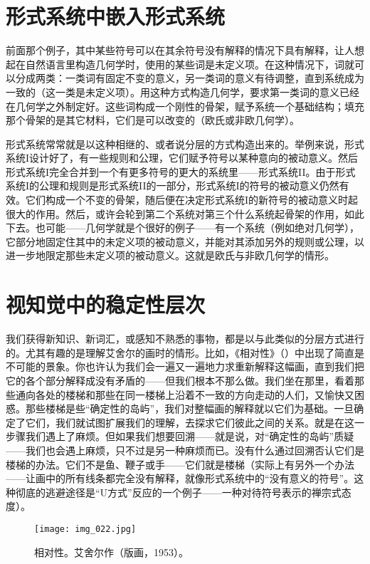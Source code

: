 \section{形式系统中嵌入形式系统}

前面那个例子，其中某些符号可以在其余符号没有解释的情况下具有解释，让人想起在自然语言里构造几何学时，使用的某些词是未定义项。在这种情况下，词就可以分成两类：一类词有固定不变的意义，另一类词的意义有待调整，直到系统成为一致的（这一类是未定义项）。用这种方式构造几何学，要求第一类词的意义已经在几何学之外制定好。这些词构成一个刚性的骨架，赋予系统一个基础结构；填充那个骨架的是其它材料，它们是可以改变的（欧氏或非欧几何学）。

形式系统常常就是以这种相继的、或者说分层的方式构造出来的。举例来说，形式系统I设计好了，有一些规则和公理，它们赋予符号以某种意向的被动意义。然后形式系统I完全合并到一个有更多符号的更大的系统里——形式系统II。由于形式系统I的公理和规则是形式系统II的一部分，形式系统I的符号的被动意义仍然有效。它们构成一个不变的骨架，随后便在决定形式系统I的新符号的被动意义时起很大的作用。然后，或许会轮到第二个系统对第三个什么系统起骨架的作用，如此下去。也可能——几何学就是个很好的例子——有一个系统（例如绝对几何学），它部分地固定住其中的未定义项的被动意义，并能对其添加另外的规则或公理，以进一步地限定那些未定义项的被动意义。这就是欧氏与非欧几何学的情形。

\section{视知觉中的稳定性层次}

我们获得新知识、新词汇，或感知不熟悉的事物，都是以与此类似的分层方式进行的。尤其有趣的是理解艾舍尔的画时的情形。比如，《相对性》（）中出现了简直是不可能的景象。你也许认为我们会一遍又一遍地力求重新解释这幅画，直到我们把它的各个部分解释成没有矛盾的——但我们根本不那么做。我们坐在那里，看着那些通向各处的楼梯和那些在同一楼梯上沿着不一致的方向走动的人们，又愉快又困惑。那些楼梯是些“确定性的岛屿”，我们对整幅画的解释就以它们为基础。一旦确定了它们，我们就试图扩展我们的理解，去探求它们彼此之间的关系。就是在这一步骤我们遇上了麻烦。但如果我们想要回溯——就是说，对“确定性的岛屿”质疑——我们也会遇上麻烦，只不过是另一种麻烦而已。没有什么通过回溯否认它们是楼梯的办法。它们不是鱼、鞭子或手——它们就是楼梯（实际上有另外一个办法——让画中的所有线条都完全没有解释，就像形式系统中的“没有意义的符号”。这种彻底的逃避途径是“U方式”反应的一个例子——一种对待符号表示的禅宗式态度）。

\begin{figure}
\texttt{[image: img\_022.jpg]}
\caption[相对性，艾舍尔作。]
  {相对性。艾舍尔作（版画，1953）。}
\end{figure}

